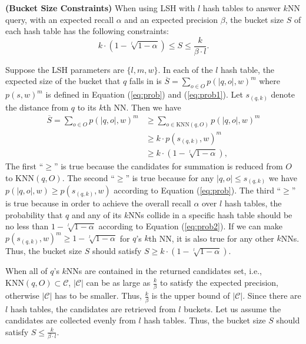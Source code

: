 \begin{prop}
\label{theorem:bucketsize}
\textbf{(Bucket Size Constraints)} When using LSH with $l$ hash tables to answer $k$NN query, with an expected recall $\alpha$ and an expected precision $\beta$, the bucket size $S$ of each hash table has the following constraints:
\begin{equation}\label{eq:bucketsize}
    k\cdot(1-\sqrt[l]{1-\alpha})\leq S\leq \frac{k}{\beta\cdot l}.
\end{equation}
\end{prop}
\begin{IEEEproof}
Suppose the LSH parameters are $\{l, m, w\}$. In each of the $l$ hash table, the expected size of the bucket that $q$ falls in is $\overline S=\sum_{o\in O}p(|q,o|,w)^{m}$ where $p(s, w)^m$ is defined in Equation (\ref{eq:prob}) and (\ref{eq:prob1}). Let $s_{(q,k)}$ denote the distance from $q$ to its $k$th NN. Then we have
\begin{equation}\label{eq:recall2}
\begin{aligned}
  \overline S=\sum_{o\in O}p(|q,o|,w)^{m}&\geq \sum_{o\in \text{KNN}(q,O)}p(|q,o|,w)^{m}\\
                                        &\geq k\cdot p(s_{(q,k)},w)^m\\
                                        &\geq k\cdot(1-\sqrt[l]{1-\alpha}),
\end{aligned}
\end{equation}
The first ``$\geq$'' is true because the candidates for summation is reduced from $O$ to $\text{KNN}(q,O)$. The second ``$\geq$'' is true because for any $|q,o|\leq s_{(q,k)}$ we have $p(|q,o|,w)\geq p(s_{(q,k)},w)$ according to Equation (\ref{eq:prob}). The third ``$\geq$'' is true because in order to achieve the overall recall $\alpha$ over $l$ hash tables, the probability that $q$ and any of its $k$NNs collide in a specific hash table should be no less than $1-\sqrt[l]{1-\alpha}$ according to Equation (\ref{eq:prob2}). If we can make $p(s_{(q,k)},w)^m\geq 1-\sqrt[l]{1-\alpha}$ for $q$'s $k$th NN, it is also true for any other $k$NNs. Thus, the bucket size $S$ should satisfy $S\geq k\cdot(1-\sqrt[l]{1-\alpha})$.

When all of $q$'s $k$NNs are contained in the returned candidates set, i.e., $\text{KNN}(q,O)\subset\mathcal{C}$, $|\mathcal{C}|$ can be as large as $\frac{k}{\beta}$ to satisfy the expected precision, otherwise $|\mathcal{C}|$ has to be smaller. Thus, $\frac{k}{\beta}$ is the upper bound of $|\mathcal{C}|$. Since there are $l$ hash tables, the candidates are retrieved from $l$ buckets. Let us assume the candidates are collected evenly from $l$ hash tables. Thus, the bucket size $S$ should satisfy $S\leq \frac{k}{\beta\cdot l}$.
\end{IEEEproof}

